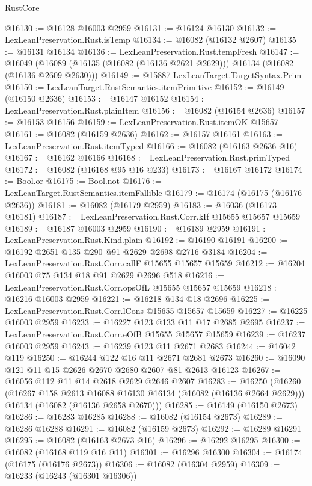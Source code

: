 \begin{lexlean}{RustCore}
\begin{coremodule}
@16130 := @16128 @16003 @2959
@16131 := @16124 @16130
@16132 := LexLeanPreservation.Rust.isTemp
@16134 := @16082 (@16132 @2607)
@16135 := @16131 @16134
@16136 := LexLeanPreservation.Rust.tempFresh
@16147 := @16049
    (@16089 (@16135 (@16082 (@16136 @2621 @2629))) @16134 (@16082 (@16136 @2609 @2630)))
@16149 := @15887 LexLeanTarget.TargetSyntax.Prim
@16150 := LexLeanTarget.RustSemantics.itemPrimitive
@16152 := @16149 (@16150 @2636)
@16153 := @16147 @16152
@16154 := LexLeanPreservation.Rust.plainItem
@16156 := @16082 (@16154 @2636)
@16157 := @16153 @16156
@16159 := LexLeanPreservation.Rust.itemOK @15657
@16161 := @16082 (@16159 @2636)
@16162 := @16157 @16161
@16163 := LexLeanPreservation.Rust.itemTyped
@16166 := @16082 (@16163 @2636 @16)
@16167 := @16162 @16166
@16168 := LexLeanPreservation.Rust.primTyped
@16172 := @16082 (@16168 @95 @16 @233)
@16173 := @16167 @16172
@16174 := Bool.or
@16175 := Bool.not
@16176 := LexLeanTarget.RustSemantics.itemFallible
@16179 := @16174 (@16175 (@16176 @2636))
@16181 := @16082 (@16179 @2959)
@16183 := @16036 (@16173 @16181)
@16187 := LexLeanPreservation.Rust.Corr.kIf @15655 @15657 @15659
@16189 := @16187 @16003 @2959
@16190 := @16189 @2959
@16191 := LexLeanPreservation.Rust.Kind.plain
@16192 := @16190 @16191
@16200 := @16192 @2651 @135 @290 @91 @2629 @2698 @2716 @3184
@16204 := LexLeanPreservation.Rust.Corr.callF @15655 @15657 @15659
@16212 := @16204 @16003 @75 @134 @18 @91 @2629 @2696 @518
@16216 := LexLeanPreservation.Rust.Corr.opsOfL @15655 @15657 @15659
@16218 := @16216 @16003 @2959
@16221 := @16218 @134 @18 @2696
@16225 := LexLeanPreservation.Rust.Corr.lCons @15655 @15657 @15659
@16227 := @16225 @16003 @2959
@16233 := @16227 @123 @133 @11 @17 @2685 @2695
@16237 := LexLeanPreservation.Rust.Corr.eOfB @15655 @15657 @15659
@16239 := @16237 @16003 @2959
@16243 := @16239 @123 @11 @2671 @2683
@16244 := @16042 @119
@16250 := @16244 @122 @16 @11 @2671 @2681 @2673
@16260 := @16090 @121 @11 @15 @2626 @2670 @2680 @2607 @81 @2613 @16123
@16267 := @16056 @112 @11 @14 @2618 @2629 @2646 @2607
@16283 := @16250
    (@16260
      (@16267 @158 @2613 @16088 @16130 @16134 (@16082 (@16136 @2664 @2629)))
      @16134
      (@16082 (@16136 @2658 @2670)))
@16285 := @16149 (@16150 @2673)
@16286 := @16283 @16285
@16288 := @16082 (@16154 @2673)
@16289 := @16286 @16288
@16291 := @16082 (@16159 @2673)
@16292 := @16289 @16291
@16295 := @16082 (@16163 @2673 @16)
@16296 := @16292 @16295
@16300 := @16082 (@16168 @119 @16 @11)
@16301 := @16296 @16300
@16304 := @16174 (@16175 (@16176 @2673))
@16306 := @16082 (@16304 @2959)
@16309 := @16233 (@16243 (@16301 @16306))

\end{coremodule}
\end{lexlean}
